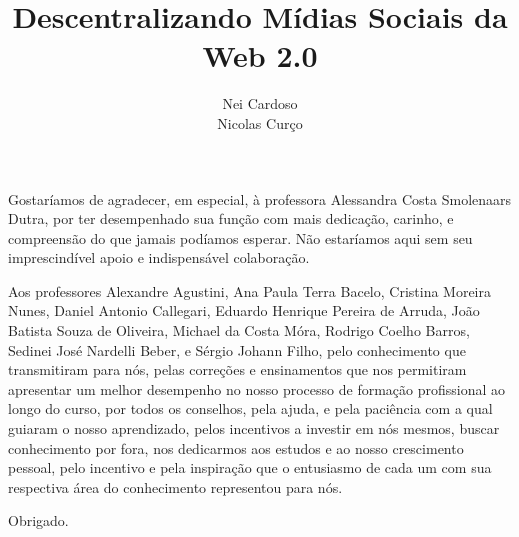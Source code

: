 \documentclass[portuguese,oneside]{tcc}
\author{Nei Cardoso

Nicolas Curço}
\title{Descentralizando Mídias Sociais da Web 2.0}
      {Decentralizing Web 2.0 Social Media}
\begin{document}



\begin{agradecimentos}
Gostaríamos de agradecer, em especial, à professora Alessandra Costa Smolenaars Dutra, por ter desempenhado sua função com mais dedicação, carinho, e compreensão do que jamais podíamos esperar.
Não estaríamos aqui sem seu imprescindível apoio e indispensável colaboração.

Aos professores
Alexandre Agustini, 
Ana Paula Terra Bacelo,
Cristina Moreira Nunes,
Daniel Antonio Callegari,
Eduardo Henrique Pereira de Arruda,
João Batista Souza de Oliveira,
Michael da Costa Móra,
Rodrigo Coelho Barros,
Sedinei José Nardelli Beber, e 
Sérgio Johann Filho, 
pelo conhecimento que transmitiram para nós, pelas correções e ensinamentos que nos permitiram apresentar um melhor desempenho no nosso processo de formação profissional ao longo do curso, por todos os conselhos, pela ajuda, e pela paciência com a qual guiaram o nosso aprendizado, pelos incentivos a investir em nós mesmos, buscar conhecimento por fora, nos dedicarmos aos estudos e ao nosso crescimento pessoal, pelo incentivo e pela inspiração que o entusiasmo de cada um com sua respectiva área do conhecimento representou para nós.

Obrigado.
\end{agradecimentos}
\end{document}
